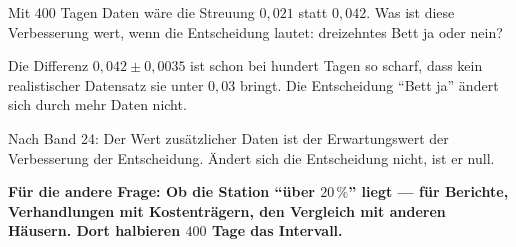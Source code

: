 \begin{aufgabe}
Mit $400$ Tagen Daten wäre die Streuung $0{,}021$ statt $0{,}042$. Was ist diese Verbesserung wert, wenn die Entscheidung lautet: dreizehntes Bett ja oder nein?

\loesung
{}
Die Differenz $0{,}042\pm0{,}0035$ ist schon bei hundert Tagen so scharf, dass kein realistischer Datensatz sie unter $0{,}03$ bringt. Die Entscheidung \enquote{Bett ja} ändert sich durch mehr Daten nicht.

Nach Band 24: Der Wert zusätzlicher Daten ist der Erwartungswert der Verbesserung der Entscheidung. Ändert sich die Entscheidung nicht, ist er null.

\begin{center}
\begin{minipage}{0.9\textwidth}
\textbf{Für die andere Frage: Ob die Station \enquote{über $20\,\%$} liegt --- für Berichte, Verhandlungen mit Kostenträgern, den Vergleich mit anderen Häusern. Dort halbieren $400$ Tage das Intervall.}
\end{minipage}
\end{center}

\begin{center}
\begin{minipage}{0.88\textwidth}
\end{minipage}
\end{center}
\end{aufgabe}

